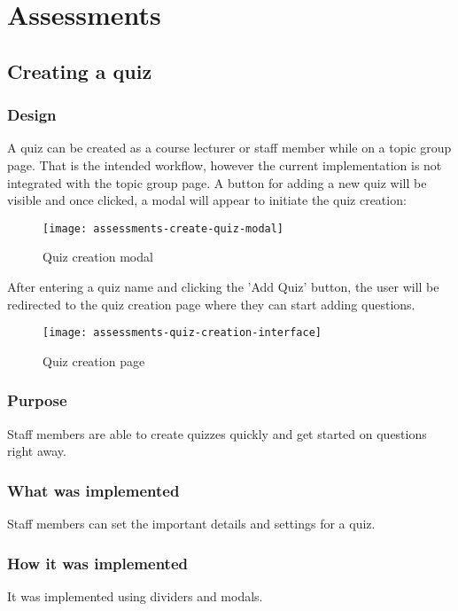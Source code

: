 \section{Assessments}

\subsection{Creating a quiz}

\subsubsection{Design}
A quiz can be created as a course lecturer or staff member while on a topic group page. That is the intended workflow, however the current implementation is not integrated with the topic group page. A button for adding a new quiz will be visible and once clicked, a modal will appear to initiate the quiz creation:

\begin{figure}[h!]
	\centering
	\texttt{[image: assessments-create-quiz-modal]}
	\caption{Quiz creation modal}
\end{figure}

After entering a quiz name and clicking the 'Add Quiz' button, the user will be redirected to the quiz creation page where they can start adding questions.


\begin{figure}[h!]
	\centering
	\texttt{[image: assessments-quiz-creation-interface]}
	\caption{Quiz creation page}
\end{figure}

\subsubsection{Purpose}
Staff members are able to create quizzes quickly and get started on questions right away.

\subsubsection{What was implemented}
Staff members can set the important details and settings for a quiz.

\subsubsection{How it was implemented}
It was implemented using dividers and modals.

